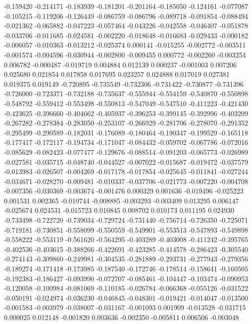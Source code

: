 -0.159420
-0.214171
-0.183939
-0.181201
-0.201164
-0.185050
-0.124161
-0.077087
-0.105215
-0.119206
-0.126449
-0.086759
-0.086796
-0.089718
-0.091854
-0.088494
-0.021362
-0.065882
-0.047223
-0.057464
-0.043226
-0.042558
-0.046407
-0.051878
-0.033706
-0.011685
-0.024581
-0.002220
-0.018648
-0.016683
-0.029433
-0.000182
-0.006057
-0.010363
-0.013212
-0.025374
0.000141
-0.015255
-0.002772
-0.003511
-0.001574
-0.004596
-0.030944
-0.002800
-0.009455
0.000772
-0.002260
-0.003254
0.006782
-0.000487
-0.019719
0.004884
0.012139
0.000237
-0.001003
0.007206
0.025680
0.021854
0.017858
0.017695
0.023257
0.024888
0.017019
0.027381
0.019375
0.019149
-0.720895
-0.735549
-0.732306
-0.731422
-0.730877
-0.731396
-0.726000
-0.723371
-0.732188
-0.735637
-0.555944
-0.554159
-0.540870
-0.550898
-0.548792
-0.559412
-0.553498
-0.550813
-0.547049
-0.547510
-0.411223
-0.421430
-0.423625
-0.396660
-0.404662
-0.405937
-0.396253
-0.399145
-0.392996
-0.403209
-0.267282
-0.278384
-0.283050
-0.253107
-0.266929
-0.281706
-0.278070
-0.291352
-0.295499
-0.290589
-0.182031
-0.176089
-0.180464
-0.190347
-0.199529
-0.165118
-0.177417
-0.172117
-0.194734
-0.171047
-0.084432
-0.059702
-0.067786
-0.072016
-0.085629
-0.082423
-0.077477
-0.129676
-0.088514
-0.091203
-0.065773
-0.026989
-0.027581
-0.035715
-0.048740
-0.044527
-0.007022
-0.015687
-0.019472
-0.037579
-0.013983
-0.026507
-0.004269
-0.017178
-0.017854
-0.025645
-0.011841
-0.027244
-0.034671
-0.028270
-0.009481
-0.010337
-0.037706
-0.021773
-0.007220
-0.004708
-0.007356
-0.030369
-0.003674
-0.001476
0.000329
0.001636
-0.019496
-0.025223
0.001531
0.002365
-0.010744
-0.008885
-0.003293
-0.003409
0.013295
0.006147
-0.025674
0.024531
-0.015723
0.010845
0.008702
0.010173
0.011195
0.024930
-0.733498
-0.722720
-0.739034
-0.729724
-0.731440
-0.756714
-0.726350
-0.725071
-0.719181
-0.730851
-0.558099
-0.550559
-0.549901
-0.553513
-0.547893
-0.549898
-0.558222
-0.553119
-0.561620
-0.564295
-0.403289
-0.403008
-0.411242
-0.395765
-0.402536
-0.403615
-0.388266
-0.422691
-0.423285
-0.414578
-0.286423
-0.305540
-0.274143
-0.309860
-0.249981
-0.304535
-0.281889
-0.293731
-0.277943
-0.279356
-0.189274
-0.171418
-0.173985
-0.187540
-0.172746
-0.178514
-0.158641
-0.160505
-0.192383
-0.186427
-0.093990
-0.072707
-0.085461
-0.104447
-0.103474
-0.090953
-0.120058
-0.100984
-0.081069
-0.110185
-0.026784
-0.066368
-0.055126
-0.031522
-0.050191
-0.024974
-0.036230
-0.046845
-0.048301
-0.019421
-0.014047
-0.013500
-0.001583
-0.003979
-0.038007
-0.031167
-0.001093
0.001909
-0.013528
-0.031715
0.000025
0.012148
-0.001820
0.003636
-0.002350
-0.005811
0.006506
-0.003048
